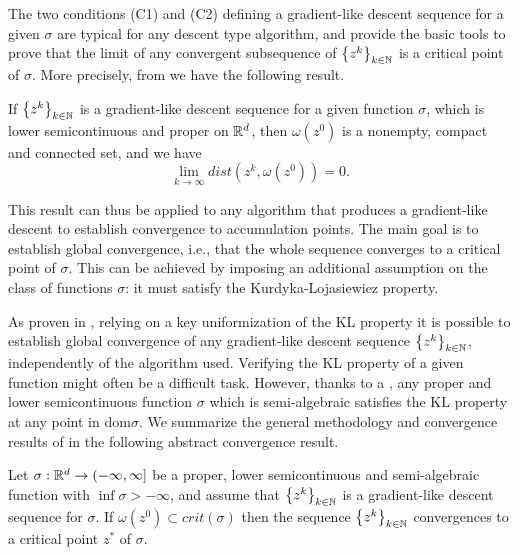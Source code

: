 The two conditions (C1) and (C2) defining a gradient-like descent sequence for a given $\sigma$ are typical for any descent type algorithm, and provide the basic tools to prove that the limit of any convergent subsequence of $\left\lbrace z^k \right\rbrace_{k \in \mathbb{N}}$ is a critical point of $\sigma$. More precisely, from \cite[Lemma 5, p. 476]{BST2014} we have the following result.

\begin{lemma}
If $\left\lbrace z^k \right\rbrace_{k \in \mathbb{N}}$ is a gradient-like descent sequence for a given function $\sigma$, which is lower semicontinuous and proper on $\mathbb{R}^d$, then $\omega\left(z^0\right)$ is a nonempty, compact and connected set, and we have
\begin{equation*}
	\lim_{k\rightarrow \infty} dist\left( z^k, \omega\left(z^0\right)\right) = 0.
\end{equation*}
\end{lemma}

This result can thus be applied to any algorithm that produces a gradient-like descent to establish convergence to accumulation points. The main goal is to establish global convergence, i.e., that the whole sequence converges to a critical point of $\sigma$. This can be achieved by imposing an additional assumption on the class of functions $\sigma$: it must satisfy the Kurdyka-{L}ojasiewiez property.\medskip

As proven in \cite{BST2014}, relying on a key uniformization of the KL property it is possible to establish global convergence of any gradient-like descent sequence $\left\lbrace z^k \right\rbrace_{k \in \mathbb{N}}$, independently of the algorithm used. Verifying the KL property of a given function might often be a difficult task. However, thanks to a , any proper and lower semicontinuous function $\sigma$ which is semi-algebraic satisfies the KL property at any point in dom$\sigma$. We summarize the general methodology and convergence results of \cite{BST2014} in the following abstract convergence result.

\begin{theorem} \label{SDP_SGP_conv_thrm}
Let $\sigma:\mathbb{R}^d \rightarrow (-\infty,\infty]$ be a proper, lower semicontinuous and semi-algebraic function with $\inf \sigma > -\infty$, and assume that $\left\lbrace z^k \right\rbrace_{k \in \mathbb{N}}$ is a gradient-like descent sequence for $\sigma$. If $\omega\left( z^0 \right) \subset crit(\sigma)$ then the sequence $\left\lbrace z^k \right\rbrace_{k \in \mathbb{N}}$ convergences to a critical point $z^{*}$ of $\sigma$.
\end{theorem}

